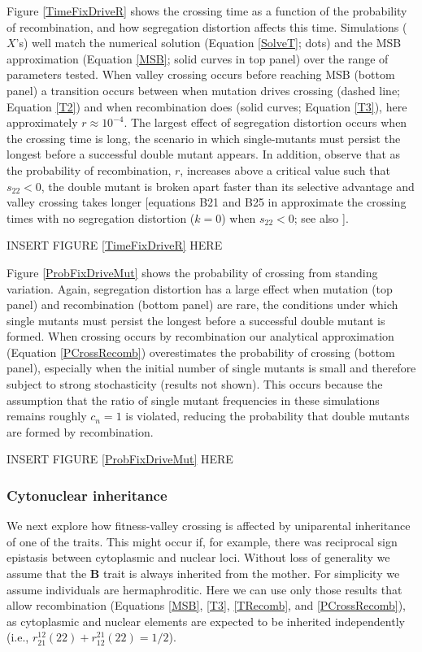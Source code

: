 \documentclass[review,3p,authoryear]{elsarticle}
\begin{document}
Figure \ref{TimeFixDriveR} shows the crossing time as a function of the probability of recombination, and how segregation distortion affects this time.
Simulations ($X$'s) well match the numerical solution (Equation \ref{SolveT}; dots) and the MSB approximation (Equation \ref{MSB}; solid curves in top panel) over the range of parameters tested.
When valley crossing occurs before reaching MSB (bottom panel) a transition occurs between when mutation drives crossing (dashed line; Equation \ref{T2}) and when recombination does (solid curves; Equation \ref{T3}), here approximately $r\approx 10^{-4}$. 
The largest effect of segregation distortion occurs when the crossing time is long, the scenario in which single-mutants must persist the longest before a successful double mutant appears.
In addition, observe that as the probability of recombination, $r$, increases above a critical value such that $s_{22} < 0$, the double mutant is broken apart faster than its selective advantage and valley crossing takes longer [equations B21 and B25 in \citealp{Weissman2010} approximate the crossing times with no segregation distortion ($k=0$) when $s_{22} < 0$; see also \citealp{Lynch2010b,Altland2011}].

INSERT FIGURE \ref{TimeFixDriveR} HERE

Figure \ref{ProbFixDriveMut} shows the probability of crossing from standing variation.
Again, segregation distortion has a large effect when mutation (top panel) and recombination (bottom panel) are rare, the conditions under which single mutants must persist the longest before a successful double mutant is formed.
When crossing occurs by recombination our analytical approximation (Equation \ref{PCrossRecomb}) overestimates the probability of crossing (bottom panel), especially when the initial number of single mutants is small and therefore subject to strong stochasticity (results not shown). 
This occurs because the assumption that the ratio of single mutant frequencies in these simulations remains roughly $c_n=1$ is violated, reducing the probability that double mutants are formed by recombination.

INSERT FIGURE \ref{ProbFixDriveMut} HERE

\subsubsection{Cytonuclear inheritance}
We next explore how fitness-valley crossing is affected by uniparental inheritance of one of the traits. 
This might occur if, for example, there was reciprocal sign epistasis between cytoplasmic and nuclear loci.
Without loss of generality we assume that the $\mathbf{B}$ trait is always inherited from the mother. 
For simplicity we assume individuals are hermaphroditic. 
Here we can use only those results that allow recombination (Equations \ref{MSB}, \ref{T3}, \ref{TRecomb}, and \ref{PCrossRecomb}), as cytoplasmic and nuclear elements are expected to be inherited independently (i.e., $r_{21}^{12}(22) + r_{12}^{21}(22)= 1/2$).
\end{document}

